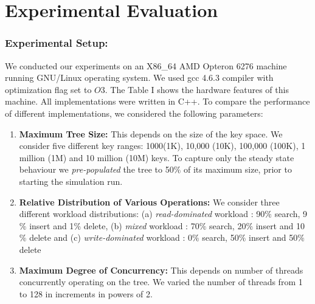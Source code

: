\section{Experimental Evaluation}
\subsubsection{Experimental Setup:} We conducted our experiments on an X86\_64 AMD Opteron 6276 machine running GNU/Linux operating system. We used gcc 4.6.3 compiler with optimization flag set to $O3$. The Table I shows the hardware features of this machine. All implementations were written in C++. To compare the performance of different implementations, we considered the following parameters:
\begin{enumerate}
\item \textbf{Maximum Tree Size:} This depends on the size of the key space. We consider five different key ranges: 1000(1K), 10,000 (10K), 100,000 (100K), 1 million (1M) and 10 million (10M) keys. To capture only the steady state behaviour we \textit{pre-populated} the tree to 50$\%$ of its maximum size, prior to starting the simulation run.
\item \textbf{Relative Distribution of Various Operations:} We consider three different workload  distributions: (a) \textit{read-dominated} workload : 90$\%$ search, 9$\%$ insert and 1$\%$ delete, (b) \textit{mixed} workload : 70$\%$ search, 20$\%$ insert and 10$\%$ delete and (c) \textit{write-dominated} workload : 0$\%$ search, 50$\%$ insert and 50$\%$ delete
\item \textbf{Maximum Degree of Concurrency:} This depends on number of threads concurrently operating on the tree. We varied the number of threads from 1 to 128 in increments in powers of 2.
\end{enumerate}
